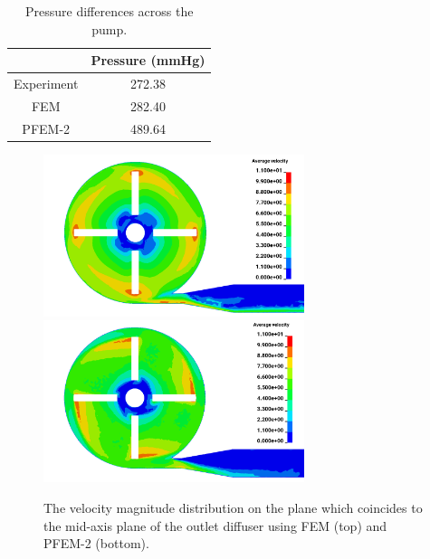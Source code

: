 \begin{table}[h]
\caption {Pressure differences across the pump.}\label{tab:pumppres} 
\centering
\begin{tabular}{|c|c|}
\hline
 & Pressure (mmHg) \\ \hline
Experiment \cite{mali_cfd}    & 272.38    \\ \hline
FEM    & 282.40             \\ \hline
PFEM-2    & 489.64          \\ \hline
\end{tabular}
\end{table}

\begin{figure}[htbp]
    \centering
    \includegraphics[width=3in]{imgs/nozzle_pump/pumpvel_fem.png}\\
    \vspace{.5cm}
    \includegraphics[width=3in]{imgs/nozzle_pump/pumpvel_pfem.png}
    \caption{The velocity magnitude distribution on the plane which coincides to the mid-axis plane of the outlet diffuser using FEM (top) and PFEM-2 (bottom).}
    \label{fig:pumpvel}
\end{figure}

